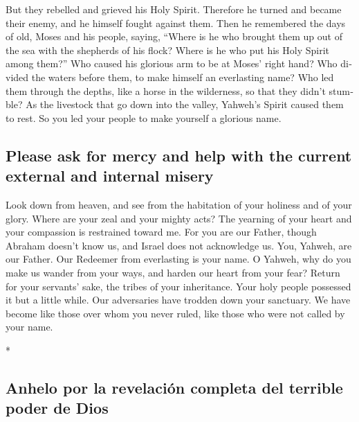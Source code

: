 \begin{paracol}{2}
\begin{otherlanguage}{english}
 But they rebelled and grieved his Holy Spirit. Therefore
he turned and became their enemy, and he himself fought against them.
 Then he remembered the days of old, Moses and his
people, saying, ``Where is he who brought them up out of the sea with
the shepherds of his flock? Where is he who put his Holy Spirit among
them?''  Who caused his glorious arm to be at Moses'
right hand? Who divided the waters before them, to make himself an
everlasting name?  Who led them through the depths, like
a horse in the wilderness, so that they didn't stumble? 
As the livestock that go down into the valley, Yahweh's Spirit caused
them to rest. So you led your people to make yourself a glorious name.

\hypertarget{please-ask-for-mercy-and-help-with-the-current-external-and-internal-misery}{%
\subsection{Please ask for mercy and help with the current external and
internal
misery}\label{please-ask-for-mercy-and-help-with-the-current-external-and-internal-misery}}

 Look down from heaven, and see from the habitation of
your holiness and of your glory. Where are your zeal and your mighty
acts? The yearning of your heart and your compassion is restrained
toward me.  For you are our Father, though Abraham
doesn't know us, and Israel does not acknowledge us. You, Yahweh, are
our Father. Our Redeemer from everlasting is your name. 
O Yahweh, why do you make us wander from your ways, and harden our heart
from your fear? Return for your servants' sake, the tribes of your
inheritance.  Your holy people possessed it but a little
while. Our adversaries have trodden down your sanctuary. 
We have become like those over whom you never ruled, like those who were
not called by your name.

\end{otherlanguage}

\switchcolumn[0]*

\hypertarget{anhelo-por-la-revelaciuxf3n-completa-del-terrible-poder-de-dios}{%
\subsection{Anhelo por la revelación completa del terrible poder de
Dios}\label{anhelo-por-la-revelaciuxf3n-completa-del-terrible-poder-de-dios}}


\end{paracol}
